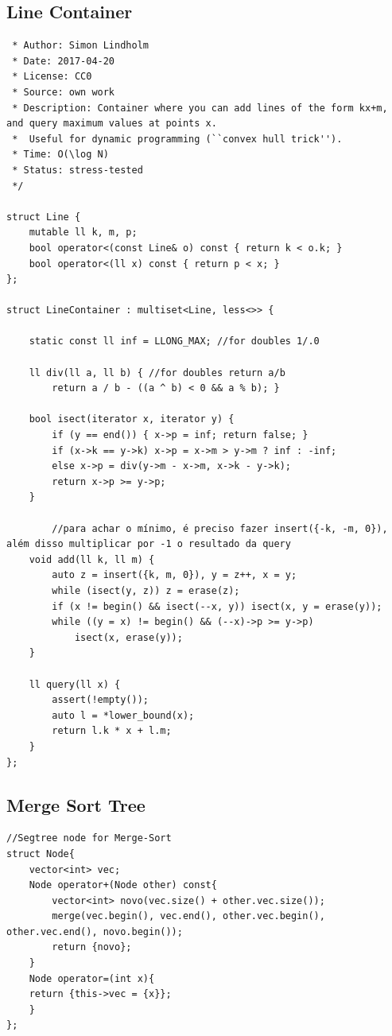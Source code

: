 \documentclass[11pt, a4paper, twoside]{article}
\begin{document}
\subsection{Line Container}
\begin{verbatim}
 * Author: Simon Lindholm
 * Date: 2017-04-20
 * License: CC0
 * Source: own work
 * Description: Container where you can add lines of the form kx+m, and query maximum values at points x.
 *  Useful for dynamic programming (``convex hull trick'').
 * Time: O(\log N)
 * Status: stress-tested
 */

struct Line {
	mutable ll k, m, p;
	bool operator<(const Line& o) const { return k < o.k; }
	bool operator<(ll x) const { return p < x; }
}; 

struct LineContainer : multiset<Line, less<>> {
    
	static const ll inf = LLONG_MAX; //for doubles 1/.0
    	
    ll div(ll a, ll b) { //for doubles return a/b
		return a / b - ((a ^ b) < 0 && a % b); }
    
	bool isect(iterator x, iterator y) {
		if (y == end()) { x->p = inf; return false; }
		if (x->k == y->k) x->p = x->m > y->m ? inf : -inf;
		else x->p = div(y->m - x->m, x->k - y->k);
		return x->p >= y->p;
	} 
    	
        //para achar o mínimo, é preciso fazer insert({-k, -m, 0}), além disso multiplicar por -1 o resultado da query
    void add(ll k, ll m) {
		auto z = insert({k, m, 0}), y = z++, x = y;
		while (isect(y, z)) z = erase(z);
		if (x != begin() && isect(--x, y)) isect(x, y = erase(y));
		while ((y = x) != begin() && (--x)->p >= y->p) 
			isect(x, erase(y));
	}
    
	ll query(ll x) {
		assert(!empty());
        auto l = *lower_bound(x);
		return l.k * x + l.m;
	}
};
\end{verbatim}

\subsection{Merge Sort Tree}
\begin{verbatim}
//Segtree node for Merge-Sort
struct Node{
    vector<int> vec;
    Node operator+(Node other) const{
        vector<int> novo(vec.size() + other.vec.size());
        merge(vec.begin(), vec.end(), other.vec.begin(), other.vec.end(), novo.begin());
        return {novo};
    }
    Node operator=(int x){
    return {this->vec = {x}};
    }
};
\end{verbatim}
\end{document}
